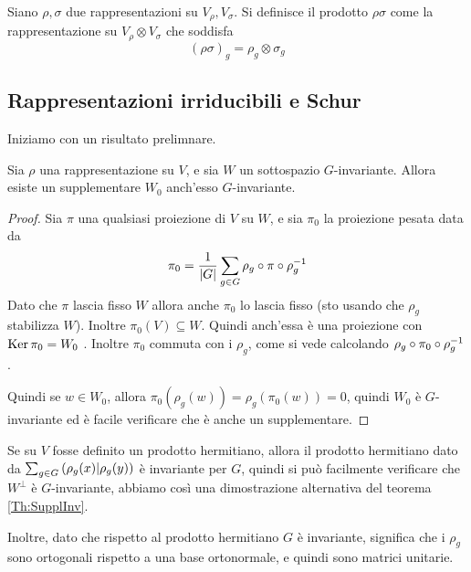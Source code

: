     \begin{mydef}
      Siano $\rho,\sigma$ due rappresentazioni su $V_\rho,V_\sigma$. Si definisce il prodotto $\rho\sigma$ come la rappresentazione su $V_\rho \otimes V_\sigma$ che soddisfa
      \[
       (\rho\sigma)_g = \rho_g \otimes \sigma_g
      \]
    \end{mydef}


  
  \subsection{Rappresentazioni irriducibili e Schur}
  
  Iniziamo con un risultato prelimnare.
  
    \begin{mytheorem}\label{Th:SupplInv}
     Sia $\rho$ una rappresentazione su $V$, e sia $W$ un sottospazio $G$-invariante. Allora esiste un supplementare $W_0$ anch'esso $G$-invariante.
    \end{mytheorem}
    
    \begin{proof}
     Sia $\pi$ una qualsiasi proiezione di $V$ su $W$, e sia $\pi_0$ la proiezione pesata data da
     \[
      \pi_0=\frac1{\left|G\right|} \sum_{g\in G} \rho_g \circ \pi \circ \rho_g^{-1}
     \]
     Dato che $\pi$ lascia fisso $W$ allora anche $\pi_0$ lo lascia fisso (sto usando che $\rho_g$ stabilizza $W$). Inoltre $\pi_0(V) \subseteq W$. Quindi anch'essa è una proiezione con $\operatorname{Ker} \pi_0=W_0$ . Inoltre $\pi_0$ commuta con i $\rho_g$, come si vede calcolando $\rho_g \circ \pi_0 \circ \rho_g^{-1}$.
     
     Quindi se $w\in W_0$, allora $\pi_0 (\rho_g(w))=\rho_g(\pi_0(w))=0$, quindi $W_0$ è $G$-invariante ed è facile verificare che è anche un supplementare.
    \end{proof}
    \begin{myobs}
     Se su $V$ fosse definito un prodotto hermitiano, allora il prodotto hermitiano dato da $\sum_{g\in G}\left(\rho_g(x) | \rho_g(y)\right)$ è invariante per $G$, quindi si può facilmente verificare che $W^\perp$ è $G$-invariante, abbiamo così una dimostrazione alternativa del teorema \ref{Th:SupplInv}.
     
     Inoltre, dato che rispetto al prodotto hermitiano $G$ è invariante, significa che i $\rho_g$ sono ortogonali rispetto a una base ortonormale, e quindi sono matrici unitarie.
    \end{myobs}

